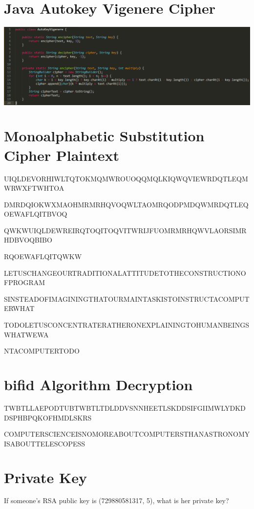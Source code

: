 \documentclass{article}
\begin{document}
\section{Java Autokey Vigenere Cipher}
\begin{center}
\includegraphics{AutoKeyVigenere.png}
\end{center}

\section{Monoalphabetic Substitution Cipher Plaintext}
UIQLDEVORHIWLTQTOKMQMWROUOQQMQLKIQWQVIEWRDQTLEQMWRWXFTWHTOA

DMRDQIOKWXMAOHMRMRHQVOQWLTAOMRQODPMDQWMRDQTLEQOEWAFLQITBVOQ

QWKWUIQLDEWREIRQTOQITOQVITWRIJFUOMRMRHQWVLAORSIMRHDBVOQBIBO

RQOEWAFLQITQWKW

\vspace{5mm}

LETUSCHANGEOURTRADITIONALATTITUDETOTHECONSTRUCTIONOFPROGRAM

SINSTEADOFIMAGININGTHATOURMAINTASKISTOINSTRUCTACOMPUTERWHAT

TODOLETUSCONCENTRATERATHERONEXPLAININGTOHUMANBEINGSWHATWEWA

NTACOMPUTERTODO

\section{bifid Algorithm Decryption}
TWBTLLAEPODTUBTWBTLTDLDDVSNNHEETLSKDDSIFGIIMWLYDKDDSPHBPQKOFHMDLSKRS

\vspace{5mm}

COMPUTERSCIENCEISNOMOREABOUTCOMPUTERSTHANASTRONOMYISABOUTTELESCOPESS

\section{Private Key}
If someone's RSA public key is (729880581317, 5), what is her private key?
\end{document}
